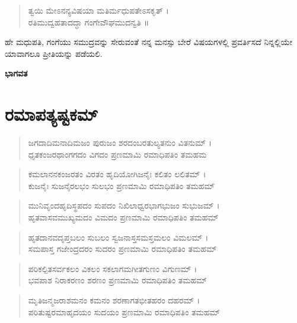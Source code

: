 \begin{verse}
ತ್ವಯಿ ಮೇಽನನ್ಯವಿಷಯಾ ಮತಿರ್ಮಧುಪತೇಽಸಕೃತ್ ।\\ರತಿಮುದ್ವಹತಾದದ್ಧಾ ಗಂಗೇವೌಘಮುದನ್ವತಿ ॥
\end{verse}

ಹೇ ಮಧುಪತಿ, ಗಂಗೆಯು ಸಮುದ್ರವನ್ನು ಸೇರುವಂತೆ ನನ್ನ ಮನಸ್ಸು ಬೇರೆ ವಿಷಯಗಳಲ್ಲಿ ಪ್ರವರ್ತಿಸದೆ ನಿನ್ನಲ್ಲಿಯೇ ಯಾವಾಗಲೂ ಪ್ರೀತಿಯನ್ನು ಪಡೆಯಲಿ.

\begin{flushright}
\textbf{ಭಾಗವತ}
\end{flushright}

\chapter*{ರಮಾಪತ್ಯಷ್ಟಕಮ್​}

\begin{verse}
ಜಗದಾದಿಮನಾದಿಮಜಂ ಪುರುಜಂ ಶರದಂಬರತುಲ್ಯತನುಂ ವಿತನುಮ್ ।\\ಧೃತಕಂಜರಥಾಂಗಗದಂ ವಿಗದಂ ಪ್ರಣಮಾಮಿ ರಮಾಧಿಪತಿಂ ತಮಹಮ 
\end{verse}

\begin{verse}
ಕಮಲಾನನಕಂಜರತಂ ವಿರತಂ ಹೃದಿಯೋಗಿಜನೈಃ ಕಲಿತಂ ಲಲಿತಮ್ ।\\ಕುಜನೈಃ ಸುಜನೈರಲಭಂ ಸುಲಭಂ ಪ್ರಣಮಾಮಿ ರಮಾಧಿಪತಿಂ ತಮಹಮ್ 
\end{verse}

\begin{verse}
ಮುನಿವೃಂದಹೃದಿಸ್ಥಪದಂ ಸುಪದಂ ನಿಖಿಲಾಧ್ವರಭಾಗಭುಜಂ ಸುಭುಜಮ್ ।\\ಹೃತವಾಸವಮುಖ್ಯಮದಂ ವಿಮದಂ ಪ್ರಣಮಾಮಿ ರಮಾಧಿಪತಿಂ ತಮಹಮ್​ 
\end{verse}

\begin{verse}
ಹೃತದಾನವದೃಪ್ತಬಲಂ ಸುಬಲಂ ಸ್ವಜನಾಸ್ತಸಮಸ್ತಮಲಂ ವಿಮಲಮ್ ।\\ಸಮಪಾಸ್ತ ಗಜೇಂದ್ರದರಂ ಸುದರಂ ಪ್ರಣಮಾಮಿ ರಮಾಧಿಪತಿಂ ತಮಹಮ್​ 
\end{verse}

\begin{verse}
ಪರಿಕಲ್ಪಿತಸರ್ವಕಲಂ ವಿಕಲಂ ಸಕಲಾಗಮಗೀತಗುಣಂ ವಿಗುಣಮ್ ।\\ಭವಪಾಶ ನಿರಾಕರಣಂ ಶರಣಂ ಪ್ರಣಮಾಮಿ ರಮಾಧಿಪತಿಂ ತಮಹಮ್ 
\end{verse}

\begin{verse}
ಮೃತಿಜನ್ಮಜರಾಶಮನಂ ಕಮನಂ ಶರಣಾಗತಭೀತಹರಂ ದಹರಮ್ ।\\ಪರಿತುಷ್ಟರಮಾಹೃದಯಂ ಸುದಯಂ ಪ್ರಣಮಾಮಿ ರಮಾಧಿಪತಿಂ ತಮಹಮ್ 
\end{verse}

